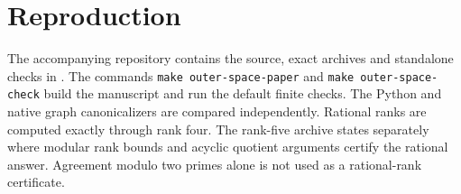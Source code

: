 \documentclass[11pt]{article}
\theoremstyle{definition}
\numberwithin{equation}{section}
\begin{document}
\section{Reproduction}
The accompanying repository contains the source, exact archives and
standalone checks in .
The commands \texttt{make outer-space-paper} and
\texttt{make outer-space-check} build the manuscript and run the
default finite checks. The Python and native graph canonicalizers
are compared independently. Rational ranks are computed exactly
through rank four. The rank-five archive states separately where
modular rank bounds and acyclic quotient arguments certify the
rational answer. Agreement modulo two primes alone is not used as
a rational-rank certificate.



\end{document}
